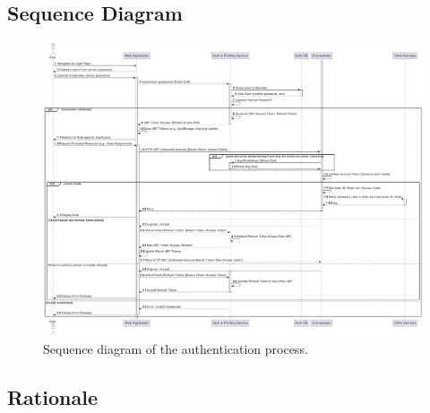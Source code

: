 \clearpage
\subsection{Sequence Diagram}

\begin{figure}[h]
    \centering
    \includegraphics[width=0.9\linewidth]{Architettura/imgs/auth_seq.pdf}
    \caption{Sequence diagram of the authentication process.}
    \label{fig:seqAuthentication}
\end{figure}

\subsection{Rationale}

